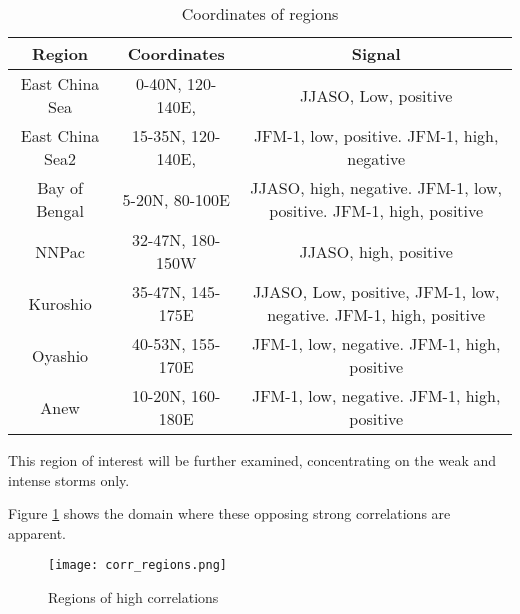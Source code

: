 %	

\begin{table}[h]
	\caption{Coordinates of regions}\label{tregion_coors}
	\begin{center}
		\begin{tabular}{ccc}
			\hline\hline
			Region & Coordinates & Signal\\
			\hline
			East China Sea & 0-40N, 120-140E,  & JJASO, Low, positive  \\ 
			East China Sea2 & 15-35N, 120-140E,  & JFM-1, low, positive. JFM-1, high, negative \\ 
			Bay of Bengal & 5-20N, 80-100E & JJASO, high, negative. JFM-1, low, positive. JFM-1, high, positive \\ 
			NNPac & 32-47N, 180-150W & JJASO, high, positive  \\ 
			Kuroshio & 35-47N, 145-175E & JJASO, Low, positive, JFM-1, low, negative. JFM-1, high, positive  \\ 
			Oyashio & 40-53N, 155-170E & JFM-1, low, negative. JFM-1, high, positive  \\
			Anew & 10-20N, 160-180E & JFM-1, low, negative. JFM-1, high, positive   \\ 
						
			\hline
		\end{tabular}
	\end{center}
\end{table}


This region of interest will be further examined, concentrating on the weak and intense storms only.

Figure \ref {fig:SCS} shows the domain where these opposing strong correlations are apparent. 
\begin{figure} %
	\noindent\texttt{[image: corr\_regions.png]} %
	\caption{Regions of high correlations}\label{fig:SCS}
\end{figure}

